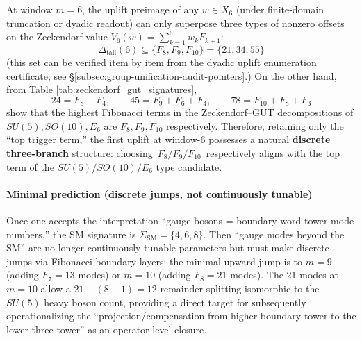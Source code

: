 

\begin{corollary}\label{cor:fold6-tail-offsets-gut-top-terms}
At window \(m=6\), the uplift preimage of any \(w\in X_6\) (under finite-domain truncation or dyadic readout) can only superpose three types of nonzero offsets on the Zeckendorf value
\(
V_6(w)=\sum_{k=1}^{6}w_kF_{k+1}
\):
\[
\Delta_{\mathrm{tail}}(6)\subseteq \{F_8,F_9,F_{10}\}=\{21,34,55\}
\]
(this set can be verified item by item from the dyadic uplift enumeration certificate; see \S\ref{subsec:group-unification-audit-pointers}.)
On the other hand, from Table \ref{tab:zeckendorf_gut_signatures},
\[
24=F_8+F_4,\qquad 45=F_9+F_6+F_4,\qquad 78=F_{10}+F_8+F_3
\]
show that the highest Fibonacci terms in the Zeckendorf--GUT decompositions of \(SU(5),SO(10),E_6\) are \(F_8,F_9,F_{10}\) respectively.
Therefore, retaining only the ``top trigger term,'' the first uplift at window-\(6\) possesses a natural \textbf{discrete three-branch} structure:
choosing \(\,F_8/F_9/F_{10}\,\) respectively aligns with the top term of the \(SU(5)/SO(10)/E_6\) type candidate.
\end{corollary}

\paragraph{Minimal prediction (discrete jumps, not continuously tunable)}
Once one accepts the interpretation ``gauge bosons = boundary word tower mode numbers,'' the SM signature is
\(\Sigma_{\mathrm{SM}}=\{4,6,8\}\).
Then ``gauge modes beyond the SM'' are no longer continuously tunable parameters but must make discrete jumps via Fibonacci boundary layers:
the minimal upward jump is to \(m=9\) (adding \(F_7=13\) modes) or \(m=10\) (adding \(F_8=21\) modes).
The \(21\) modes at \(m=10\) allow a \(21-(8+1)=12\) remainder splitting isomorphic to the \(SU(5)\) heavy boson count,
providing a direct target for subsequently operationalizing the ``projection/compensation from higher boundary tower to the lower three-tower'' as an operator-level closure.

